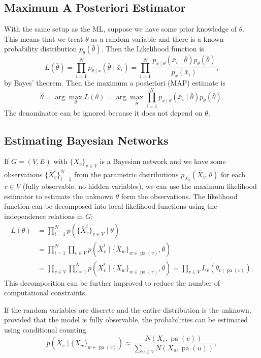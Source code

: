 \documentclass[a4paper]{article}
\newcommand{\given}{\mid}
\DeclareMathOperator{\pa}{pa} %
\theoremstyle{plain}
\theoremstyle{definition}
\theoremstyle{remark}
\begin{document}
\subsection{Maximum A Posteriori Estimator}

With the same setup as the ML, suppose we have some prior knowledge of
$\theta$. This means that we treat $\theta$ as a random variable and there is
a known probability distribution $p_\theta(\bar{\theta})$. Then the Likelihood
function is
\[
  L(\bar{\theta}) = \prod_{i=1}^N
    p_{\theta \given x}(\bar{\theta} \given \bar{x}_i)
    = \prod_{i=1}^N \frac{
        p_{x \given \theta}(\bar{x}_i \given \bar{\theta})
        p_\theta(\bar{\theta})
      }{p_x(\bar{x}_i)},
\]
by Bayes' theorem. Then the maximum a posteriori (MAP) estimate is
\[
  \hat{\theta} = \arg \max_\theta L(\theta)
    = \arg \max_{\bar{\theta}} \prod_{i=1}^N
        p_{x \given \theta}(\bar{x}_i \given \bar{\theta})
        p_\theta(\bar{\theta}).
\]
The denominator can be ignored because it does not depend on $\theta$.


\subsection{Estimating Bayesian Networks}

If $G = (V,E)$ with $\{X_v\}_{v \in V}$ is a Bayesian network and we have some
observations $\{\bar{X}_v^i\}_{i=1}^N$ from the parametric distributions
$p_{X_v}(\bar{X}_v, \theta)$ for each $v \in V$ (fully observable, no hidden
variables), we can use the maximum likelihood estimator to estimate the
unknown $\theta$ form the observations. The likelihood function can be
decomposed into local likelihood functions using the independence relations in
$G$:
\begin{align*}
  L(\theta) &= \prod_{i=1}^N p(\{\bar{X}_v^i\}_{v \in V} \given \theta) \\
    &= \prod_{i=1}^N \prod_{v \in V}  p(
      \bar{X}_v^i \given
      \{\bar{X}_w\}_{w \in \pa(v)}, \theta) \\
    &= \prod_{v \in V} \prod_{i=1}^N
        p(\bar{X}_v^i \given \{\bar{X}_w\}_{w \in \pa(v)}, \theta) 
    = \prod_{v \in V} L_v(\theta_{v \given \pa(v)}).
\end{align*}
This decomposition can be further improved to reduce the number of
computational constraints.

If the random variables are discrete and the entire distribution is the
unknown, provided that the model is fully observable, the probabilities can be
estimated using conditional counting
\[
  p(\bar{X}_v \given \{X_w\}_{w \in \pa(v)}) \approx
    \frac{N(X_v, \pa(v))}{\sum_{u \in V} N(X_u, \pa(u))},
\]
\end{document}
